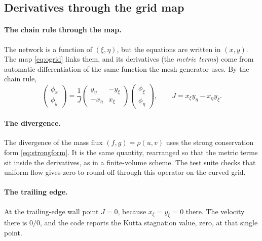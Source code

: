 \subsection{Derivatives through the grid map}
\label{app:pinnderivs}

\paragraph{The chain rule through the map.}
The network is a function of $(\xi,\eta)$, but the equations are written in $(x,y)$. The map
\cref{eq:ogrid} links them, and its derivatives (the \emph{metric terms}) come from automatic
differentiation of the same function the mesh generator uses. By the chain rule,
\begin{equation}
  \begin{pmatrix}\phi_x\\ \phi_y\end{pmatrix}
  = \frac1J\begin{pmatrix} y_\eta & -y_\xi\\ -x_\eta & x_\xi\end{pmatrix}
    \begin{pmatrix}\phi_\xi\\ \phi_\eta\end{pmatrix},\qquad J = x_\xi y_\eta - x_\eta y_\xi .
\end{equation}

\paragraph{The divergence.}
The divergence of the mass flux $(f,g) = \rho(u,v)$ uses the strong conservation form
\cref{eq:strongform}. It is the same quantity, rearranged so that the metric terms sit inside the
derivatives, as in a finite-volume scheme. The test suite checks that uniform flow gives zero to
round-off through this operator on the curved grid.

\paragraph{The trailing edge.}
At the trailing-edge wall point $J = 0$, because $x_\xi = y_\xi = 0$ there. The velocity there is
$0/0$, and the code reports the Kutta stagnation value, zero, at that single point.


